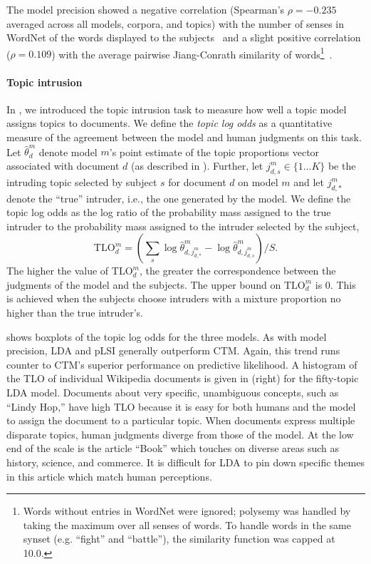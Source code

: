 The model precision showed a negative correlation (Spearman's $\rho =
-0.235$ averaged across all models, corpora, and topics) with the
number of senses in WordNet of the words displayed to the
subjects~\cite{Miller90} and a slight positive correlation ($\rho =
0.109$) with the average pairwise Jiang-Conrath similarity of
words\footnote{Words without entries in WordNet were ignored; polysemy
  was handled by taking the maximum over all senses of words.  To
  handle words in the same synset (e.g. ``fight'' and ``battle''), the
  similarity function was capped at 10.0.}~\cite{jiang-97}.  

\paragraph{Topic intrusion}

In , we introduced the topic intrusion task
to measure how well a topic model assigns topics to documents.  We
define the \emph{topic log odds} as a quantitative measure of the
agreement between the model and human judgments on this task.  Let
$\hat{\theta}^m_d$ denote model $m$'s point estimate of the topic
proportions vector associated with document $d$ (as described in
).  Further, let $j^m_{d,s} \in \{1\ldots K\}$
be the intruding topic selected by subject $s$ for document $d$ on
model $m$ and let $j^m_{d,*}$ denote the ``true'' intruder, i.e., the
one generated by the model.  We define the topic log odds as the log
ratio of the probability mass assigned to the true intruder to the
probability mass assigned to the intruder selected by the subject,
\begin{equation}\label{eq:tlo}
  \mathrm{TLO}^m_d = (\textstyle \sum_{s} \log \hat{\theta}^m_{d,j^m_{d,*}} - \log \hat{\theta}^m_{d,j^m_{d,s}}) / S.
\end{equation}
The higher the value of $\mathrm{TLO}^m_d$, the greater the
correspondence between the judgments of the model and the subjects.
The upper bound on $\mathrm{TLO}^m_d$ is 0.  This is achieved when the
subjects choose intruders with a mixture proportion no higher than the
true intruder's.


 shows boxplots of the topic log odds for the three
models.  As with model precision, LDA and pLSI generally outperform
CTM.  Again, this trend runs counter to CTM's superior performance on
predictive likelihood.  A histogram of the TLO of individual Wikipedia
documents is given in  (right) for the
fifty-topic LDA model.  Documents about very specific, unambiguous
concepts, such as ``Lindy Hop,'' have high TLO because it is easy for
both humans and the model to assign the document to a particular
topic.  When documents express multiple disparate topics, human
judgments diverge from those of the model.  At the low end of the
scale is the article ``Book'' which touches on diverse areas such as
history, science, and commerce.  It is difficult for LDA to pin down
specific themes in this article which match human perceptions.

